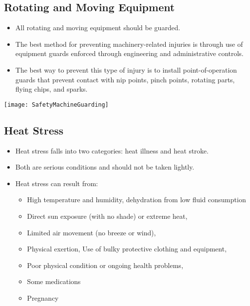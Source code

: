 \subsection{Rotating and Moving Equipment}

\begin{itemize}
\item All rotating and moving equipment should be guarded. 
\item The best method for preventing machinery-related injuries is through use of equipment guards enforced through engineering and administrative controls.   
\item The best way to prevent this type of injury is to install point-of-operation guards that prevent contact with nip points, pinch points, rotating parts, flying chips, and sparks.
\end{itemize}
\begin{center}
\texttt{[image: SafetyMachineGuarding]}\\
\end{center}

\subsection{Heat Stress}
\begin{itemize}
\item Heat stress falls into two categories: heat illness and heat stroke. 
\item Both are serious conditions and should not be taken lightly. 
\item Heat stress can result from: 
\begin{itemize}
\item High temperature and humidity, dehydration from low fluid consumption
\item Direct sun exposure (with no shade) or extreme heat, 
\item Limited air movement (no breeze or wind), 
\item Physical exertion, Use of bulky protective clothing and equipment, 
\item Poor physical condition or ongoing health problems, 
\item Some medications
\item Pregnancy
\end{itemize}
\end{itemize} 

